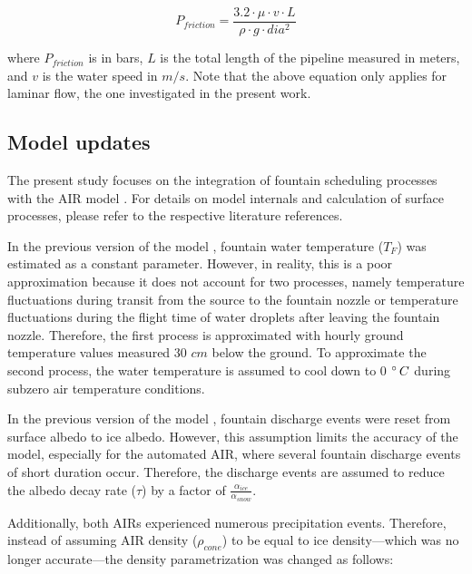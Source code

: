 \documentclass[tc, manuscript]{copernicus}
\begin{document}
\begin{equation}
  \label{eqn:friction}
  P_{friction} = \frac{3.2 \cdot \mu \cdot v \cdot L}{\rho \cdot g \cdot dia^2}
\end{equation}

where $P_{friction}$ is in bars, $L$ is the total length of the pipeline measured in meters, and $v$ is the water speed in
$m/s$. Note that the above equation only applies for laminar flow, the one investigated in the present work.

\subsection{Model updates}

The present study focuses on the integration of fountain scheduling processes with the AIR model
\citep{balasubramanianInfluenceMeteorologicalConditions2022}. For details on model internals and calculation of
surface processes, please refer to the respective literature references. 

In the previous version of the model \citep{balasubramanianInfluenceMeteorologicalConditions2022}, fountain
water temperature ($T_F$) was estimated as a constant parameter. However, in reality, this is a poor
approximation because it does not account for two processes, namely temperature fluctuations during transit from
the source to the fountain nozzle or temperature fluctuations during the flight time of water droplets after
leaving the fountain nozzle. Therefore, the first process is approximated with hourly ground temperature values
measured 30 $cm$ below the ground. To approximate the second process, the water temperature is assumed to cool
down to 0 $^{\circ}\,C$ during subzero air temperature conditions.

In the previous version of the model \citep{balasubramanianInfluenceMeteorologicalConditions2022}, fountain
discharge events were reset from surface albedo to ice albedo. However, this assumption limits the accuracy of
the model, especially for the automated AIR, where several fountain discharge events of short duration occur.
Therefore, the discharge events are assumed to reduce the albedo decay rate ($\tau$) by a factor of
$\frac{\alpha_{ice}}{\alpha_{snow}}$.

Additionally, both AIRs experienced numerous precipitation events. Therefore, instead of assuming AIR density
($\rho_{cone}$) to be equal to ice density---which was no longer accurate---the density
parametrization was changed as follows:
\end{document}
